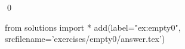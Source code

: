 
\begin{ex} 
  \label{ex:empty0}
  
  \qed
\end{ex} 
\begin{python0}
from solutions import *
add(label="ex:empty0",
    srcfilename='exercises/empty0/answer.tex') 
\end{python0}
